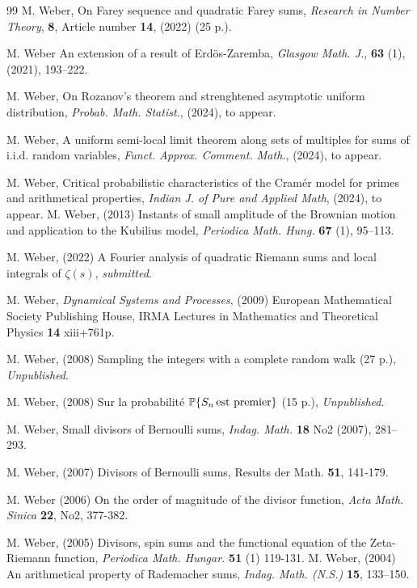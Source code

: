 \documentclass[11pt,draft,reqno]{amsart}
\theoremstyle{definition}
\theoremstyle{remarks}
\numberwithin{equation}{section}
\def\P{{\mathcal P}}
\def\P{{\mathbb P}}
\begin{document}
\begin{thebibliography}{99}
 M. Weber, On Farey sequence and quadratic Farey sums, \emph{ Research in Number Theory}, {\bf 8}, Article
number {\bf 14}, (2022)  (25 p.). 

    M. Weber  An extension of a result of Erd\"os-Zaremba,
 \emph{Glasgow Math. J.}, {\bf 63} (1), (2021), 193--222. 

 M.  Weber, On Rozanov's theorem and strenghtened asymptotic  uniform distribution, 
\emph{Probab. Math. Statist.},  (2024), to appear.

  M.  Weber,    A uniform semi-local limit theorem along    sets of multiples   for sums of i.i.d. 
   random variables, 
 \emph{Funct.
Approx. Comment. Math.}, (2024), to appear.  
     
 M.  Weber,  %
      Critical probabilistic characteristics of the
Cram\'er model for primes and arithmetical properties,  
  \emph{Indian J. of Pure and Applied Math},   (2024), to appear. 
     M.  Weber,  (2013) Instants of small amplitude of the Brownian motion   and application to    the 
 Kubilius model,  
\emph{Periodica Math. Hung.} {\bf 67}  (1), 95--113.   

   M. Weber,   (2022) A Fourier analysis  of quadratic   Riemann sums and local integrals of  $ {\zeta(s)}$, \emph{submitted}.
 
   M.  Weber,   \emph{Dynamical Systems and Processes},  (2009)  European Mathematical Society Publishing
House, IRMA Lectures in Mathematics and Theoretical Physics {\bf 14}  
   xiii+761p.

  M.  Weber, (2008) Sampling the integers with a complete random walk (27 p.), \emph{Unpublished}.

  M.  Weber, (2008) Sur la probabilit\'e $\P\{ S_n\, \hbox{est premier}\}$ (15 p.), \emph{Unpublished}.

   M.  Weber,    Small divisors of Bernoulli sums,   \emph{Indag. Math.} {\bf 18} No2 (2007),   281--293.  

 M.  Weber, (2007) Divisors of Bernoulli sums,    Results der Math. {\bf 51}, 141-179.

   M.  Weber (2006) On the order of magnitude
of the divisor function,   \emph{Acta Math. Sinica} {\bf 22}, No2, 377-382. 


   M.  Weber, (2005) Divisors, spin sums  and the functional equation of the
 Zeta-Riemann function, \emph{Periodica Math. Hungar.}  {\bf 51} (1) 119-131.
    M.  Weber, (2004)  An arithmetical property of
Rademacher sums,  \emph{Indag.  Math. \emph{(}N.S.\emph{)}}  {\bf 15}, 133--150.
 
 
   \end{thebibliography}  




 
 
\end{document}
